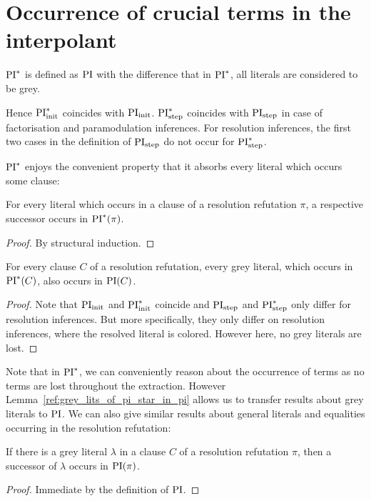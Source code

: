 \documentclass[,%
	draft=false,%
	numbers=noendperiod
	12pt,
	a4paper,
	oneside,%
	openany,
]{memoir}
\begin{document}
\section{Occurrence of crucial terms in the interpolant}

\begin{defi}[$\PI^*$]
	$\PI^*$ is defined as $\operatorname{PI}$ with the difference that in $\PI^*$, all literals are considered to be grey.
\end{defi}

Hence $\operatorname{PI}_{\mathrm{init}}^*$ coincides with $\operatorname{PI}_{\mathrm{init}}$.
$\operatorname{PI}_{\mathrm{step}}^*$ coincides with $\operatorname{PI}_{\mathrm{step}}$ in case of factorisation and paramodulation inferences.
For resolution inferences, the first two cases in the definition of $\operatorname{PI}_{\mathrm{step}}$ do not occur for $\operatorname{PI}_{\mathrm{step}}^*$.

$\PI^*$ enjoys the convenient property that it absorbs every literal which occurs some clause:

\begin{prop}
	For every literal which occurs in a clause of a resolution refutation $\pi$, a respective successor occurs in $\operatorname{PI}^*(\pi)$.
\end{prop}
\begin{proof}
	By structural induction.
\end{proof}

\begin{lemma}
	\label{lemma:grey_lits_of_pi_star_in_pi}
	For every clause $C$ of a resolution refutation,
	every grey literal, which occurs in $\operatorname{PI}^*(C)$, also occurs in $\operatorname{PI}(C)$.
\end{lemma}
\begin{proof}
	Note that $\operatorname{PI}_{\mathrm{init}}$ and $\operatorname{PI}_{\mathrm{init}}^*$ coincide and $\operatorname{PI}_{\mathrm{step}}$ and $\operatorname{PI}_{\mathrm{step}}^*$ only differ for resolution inferences.
	But more specifically, they only differ on resolution inferences, where the resolved literal is colored. However here, no grey literals are lost.
\end{proof}

Note that in $\PI^*$, we can conveniently reason about the occurrence of terms as no terms are lost throughout the extraction.
However Lemma~\ref{ref:grey_lits_of_pi_star_in_pi} allows us to transfer results about grey literals to $\operatorname{PI}$.
We can also give similar results about general literals and equalities occurring in the resolution refutation:

\begin{lemma}
	\label{lemma:grey_lits_all_in_PI}
	If there is a grey literal $\lambda$ in a clause $C$ of a resolution refutation $\pi$,
	then a successor of $\lambda$ occurs in $\operatorname{PI}(\pi)$.
\end{lemma}
\begin{proof}
	Immediate by the definition of $\operatorname{PI}$.
\end{proof}
\end{document}
